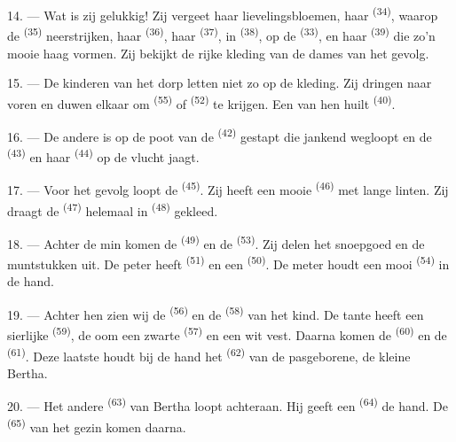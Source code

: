 14. --- Wat is zij gelukkig! Zij vergeet haar lievelingsbloemen, haar
 \textsuperscript{(34)}, waarop de 
\textsuperscript{(35)} neerstrijken, haar  \textsuperscript{(36)}, haar
 \textsuperscript{(37)}, in 
\textsuperscript{(38)}, op de  \textsuperscript{(33)}, en haar 
\textsuperscript{(39)} die zo'n mooie haag vormen. Zij bekijkt de rijke kleding van de dames
van het gevolg.

15. --- De kinderen van het dorp letten niet zo op de kleding. Zij dringen naar voren en duwen
elkaar om  \textsuperscript{(55)} of
 \textsuperscript{(52)} te krijgen. Een van hen huilt
\textsuperscript{(40)}.

16. --- De andere is op de poot van de  \textsuperscript{(42)} gestapt die
jankend wegloopt en de  \textsuperscript{(43)} en haar
 \textsuperscript{(44)} op de vlucht jaagt.

\VUsaut{5.0mm}
\VUsaut{4.0mm}

17. --- Voor het gevolg loopt de  \textsuperscript{(45)}. Zij heeft een mooie
 \textsuperscript{(46)} met lange linten. Zij draagt de
 \textsuperscript{(47)} helemaal in 
\textsuperscript{(48)} gekleed.

18. --- Achter de min komen de  \textsuperscript{(49)} en de
 \textsuperscript{(53)}. Zij delen het snoepgoed en de muntstukken
uit. De peter heeft  \textsuperscript{(51)} en een
 \textsuperscript{(50)}. De meter houdt een mooi
 \textsuperscript{(54)} in de hand.

19. --- Achter hen zien wij de  \textsuperscript{(56)} en de
 \textsuperscript{(58)} van het kind. De tante heeft een sierlijke
 \textsuperscript{(59)}, de oom een zwarte 
\textsuperscript{(57)} en een wit vest. Daarna komen de  \textsuperscript{(60)}
en de  \textsuperscript{(61)}. Deze laatste houdt bij de hand het 
\textsuperscript{(62)} van de pasgeborene, de kleine Bertha.

20. --- Het andere  \textsuperscript{(63)} van Bertha loopt achteraan. Hij
geeft een  \textsuperscript{(64)} de hand. De 
\textsuperscript{(65)} van het gezin komen daarna.

